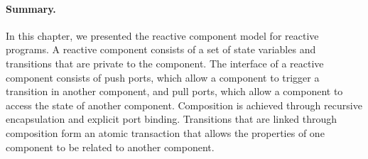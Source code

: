 \paragraph{Summary.}
In this chapter, we presented the reactive component model for reactive programs.
A reactive component consists of a set of state variables and transitions that are private to the component.
The interface of a reactive component consists of push ports, which allow a component to trigger a transition in another component, and pull ports, which allow a component to access the state of another component.
Composition is achieved through recursive encapsulation and explicit port binding.
Transitions that are linked through composition form an atomic transaction that allows the properties of one component to be related to another component.








